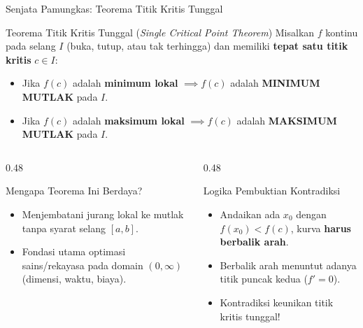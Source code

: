 \documentclass[aspectratio=43,10pt]{beamer}
\begin{document}
\begin{frame}{Senjata Pamungkas: Teorema Titik Kritis Tunggal}
    \begin{block}{Teorema Titik Kritis Tunggal (\textit{Single Critical Point Theorem})}
        Misalkan $f$ kontinu pada selang $I$ (buka, tutup, atau tak terhingga) dan memiliki \textbf{tepat satu titik kritis} $c \in I$:
        \begin{itemize}
            \item Jika $f(c)$ adalah \textbf{minimum lokal} $\implies f(c)$ adalah \textbf{MINIMUM MUTLAK} pada $I$.
            \item Jika $f(c)$ adalah \textbf{maksimum lokal} $\implies f(c)$ adalah \textbf{MAKSIMUM MUTLAK} pada $I$.
        \end{itemize}
    \end{block}

    \vspace{-0.15cm}
    \begin{columns}[T]
        \begin{column}{0.48\textwidth}
            \begin{exampleblock}{Mengapa Teorema Ini Berdaya?}
                \begin{itemize}
                    \item Menjembatani jurang lokal ke mutlak tanpa syarat selang $[a, b]$.
                    \item Fondasi utama optimasi sains/rekayasa pada domain $(0, \infty)$ (dimensi, waktu, biaya).
                \end{itemize}
            \end{exampleblock}
        \end{column}

        \begin{column}{0.48\textwidth}
            \begin{alertblock}{Logika Pembuktian Kontradiksi}
                \begin{itemize}
                    \item Andaikan ada $x_0$ dengan $f(x_0) < f(c)$, kurva \textbf{harus berbalik arah}.
                    \item Berbalik arah menuntut adanya titik puncak kedua ($f'=0$).
                    \item Kontradiksi keunikan titik kritis tunggal!
                \end{itemize}
            \end{alertblock}
        \end{column}
    \end{columns}
\end{frame}
\end{document}
